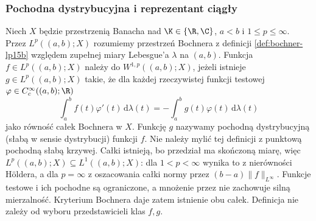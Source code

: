 \subsubsection{Pochodna dystrybucyjna i reprezentant ciągły}

\begin{definicja}
\label{def:bochner-sobolev15b}
Niech $X$ będzie przestrzenią Banacha nad $\K\in\{\R,\C\}$,
$a<b$ i $1\le p\le\infty$. Przez $L^p((a,b);X)$
rozumiemy przestrzeń Bochnera z definicji
\ref{def:bochner-lp15b} względem zupełnej miary
Lebesgue'a $\lambda$ na $(a,b)$.
Funkcja $f\in L^p((a,b);X)$ należy do $W^{1,p}((a,b);X)$,
jeżeli istnieje $g\in L^p((a,b);X)$ takie, że dla
każdej rzeczywistej funkcji testowej
$\varphi\in C_c^\infty((a,b);\R)$
\[
 \int_a^b f(t)\varphi'(t)\,\mathrm d\lambda(t)
 =-\int_a^b g(t)\varphi(t)\,\mathrm d\lambda(t)
\]
jako równość całek Bochnera w $X$.
Funkcję $g$ nazywamy pochodną dystrybucyjną (słabą
w sensie dystrybucji) funkcji $f$. Nie należy mylić
tej definicji z punktową pochodną słabą krzywej.
Całki istnieją, bo przedział ma skończoną miarę,
więc $L^p((a,b);X)\subseteq L^1((a,b);X)$:
dla $1<p<\infty$ wynika to z nierówności Höldera,
a dla $p=\infty$ z oszacowania całki normy przez
$(b-a)\|f\|_{L^\infty}$. Funkcje testowe i ich
pochodne są ograniczone, a mnożenie przez nie
zachowuje silną mierzalność. Kryterium Bochnera
daje zatem istnienie obu całek. Definicja nie zależy
od wyboru przedstawicieli klas $f,g$.
\end{definicja}

